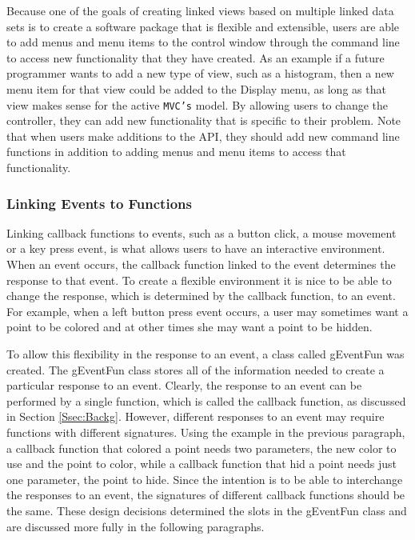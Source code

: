 \documentclass{article}[11pt]
\newcommand{\Robject}[1]{{\texttt{#1}}}
\newcommand{\Rclass}[1]{\textsf{#1}}
\begin{document}
Because one of the goals of creating linked views based on multiple linked
data sets is to create a software package that is flexible and extensible,
users are able to add menus and menu items to the control window through
the command line to access new functionality that they have created.  As an
example if a future programmer wants to add a new type of view, such as a
histogram, then a new menu item for that view could be added to the Display
menu, as long as that view makes sense for the active \Robject{MVC's} model.
By allowing users to change the controller, they can add new functionality that
is specific to their problem.  Note that when users make additions to the API,
they should add new command line functions in addition to adding menus and
menu items to access that functionality.

\subsubsection{Linking Events to Functions}\label{Ssec:OneEvent}

Linking callback functions to events, such as a button click, a mouse movement
or a key press event, is what allows users to have an interactive
environment.  When an event occurs, the callback function linked to the event
determines the response to that event.  To create a flexible environment
it is nice to be able to change the response, which is determined by the
callback function, to an event.  For example, when a left button press event
occurs, a user may sometimes want a point to be colored and at other times she
may want a point to be hidden.  

To allow this flexibility in the response to an event, a class called
\Rclass{gEventFun} was created.  The \Rclass{gEventFun} class stores all of
the information needed to create a particular response to an event.
Clearly, the response to an event can be performed by a single function,
which is called the callback function, as discussed in Section
\ref{Ssec:Backg}.  However, different responses to an event may require
functions with different signatures.  Using the example in the previous
paragraph, a callback function that colored a point needs two parameters,
the new color to use and the point to color, while a callback function that
hid a point needs just one parameter, the point to hide.  Since the
intention is to be able to interchange the responses to an event, the
signatures of different callback functions should be the same.  These design
decisions determined the slots in the \Rclass{gEventFun} class and are
discussed more fully in the following paragraphs. 
\end{document}
